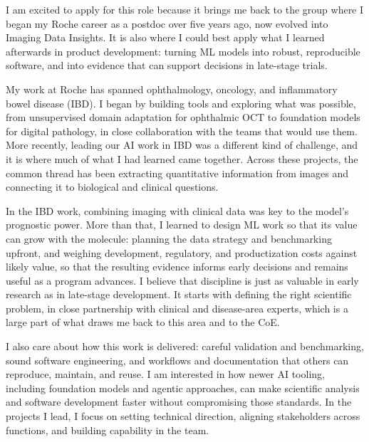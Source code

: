 \documentclass[10pt, letter]{ag-cv} %
\begin{document}
\makecvheader %

\makelettertitlenorec %


\begin{cvletter}


\begin{flushleft}

I am excited to apply for this role because it brings me back to the group where I began my Roche career as a postdoc over five years ago, now evolved into Imaging Data Insights. It is also where I could best apply what I learned afterwards in product development: turning ML models into robust, reproducible software, and into evidence that can support decisions in late-stage trials.

My work at Roche has spanned ophthalmology, oncology, and inflammatory bowel disease (IBD). I began by building tools and exploring what was possible, from unsupervised domain adaptation for ophthalmic OCT to foundation models for digital pathology, in close collaboration with the teams that would use them. More recently, leading our AI work in IBD was a different kind of challenge, and it is where much of what I had learned came together. Across these projects, the common thread has been extracting quantitative information from images and connecting it to biological and clinical questions.

In the IBD work, combining imaging with clinical data was key to the model's prognostic power. More than that, I learned to design ML work so that its value can grow with the molecule: planning the data strategy and benchmarking upfront, and weighing development, regulatory, and productization costs against likely value, so that the resulting evidence informs early decisions and remains useful as a program advances. I believe that discipline is just as valuable in early research as in late-stage development. It starts with defining the right scientific problem, in close partnership with clinical and disease-area experts, which is a large part of what draws me back to this area and to the CoE.

I also care about how this work is delivered: careful validation and benchmarking, sound software engineering, and workflows and documentation that others can reproduce, maintain, and reuse. I am interested in how newer AI tooling, including foundation models and agentic approaches, can make scientific analysis and software development faster without compromising those standards. In the projects I lead, I focus on setting technical direction, aligning stakeholders across functions, and building capability in the team.


\end{flushleft}
\end{cvletter}
\end{document}
